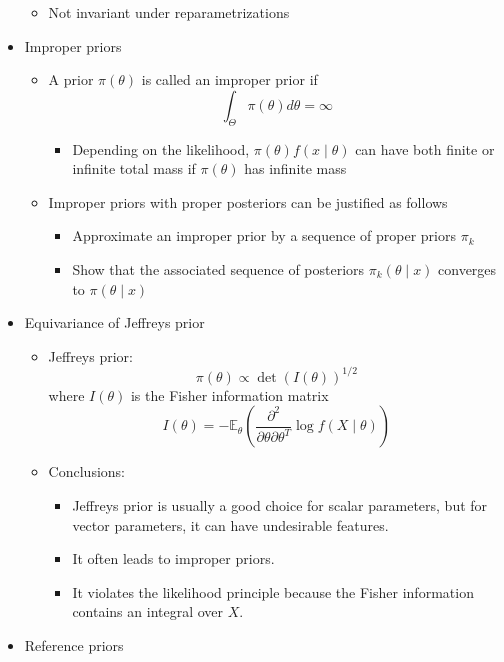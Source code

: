\documentclass[a4paper]{article}
\begin{document}
\begin{itemize}
\begin{itemize}
        \item Not invariant under reparametrizations
    \end{itemize}
    \item Improper priors
    \begin{itemize}
        \item A prior $\pi(\theta)$ is called an improper prior if
        \[\int_{\Theta}\pi(\theta)d\theta=\infty \]
        \begin{itemize}
            \item Depending on the likelihood, $\pi(\theta)f(x\mid\theta)$ can have both finite or infinite total mass if $\pi(\theta)$ has infinite mass
        \end{itemize}
        \item Improper priors with proper posteriors can be justified as follows
        \begin{itemize}
            \item Approximate an improper prior by a sequence of proper priors $\pi_k$
            \item Show that the associated sequence of posteriors $\pi_k(\theta\mid x)$ converges to $\pi(\theta\mid x)$
        \end{itemize}
    \end{itemize}
    \item Equivariance of Jeffreys prior
    \begin{itemize}
        \item Jeffreys prior:
        \[\pi(\theta)\propto\det(I(\theta))^{1/2} \]
        where $I(\theta)$ is the Fisher information matrix
        \[I(\theta)=-\mathbb{E}_{\theta}\left(\frac{\partial^2}{\partial\theta\partial\theta^T}\log f(X\mid\theta) \right) \]
        \item Conclusions:
        \begin{itemize}
            \item Jeffreys prior is usually a good choice for scalar parameters, but for vector parameters, it can have undesirable features.
            \item It often leads to improper priors.
            \item It violates the likelihood principle because the Fisher information contains an integral over $X$.
        \end{itemize}
    \end{itemize}
    \item Reference priors
    \begin{itemize}

\end{itemize}
\end{itemize}
\end{document}
